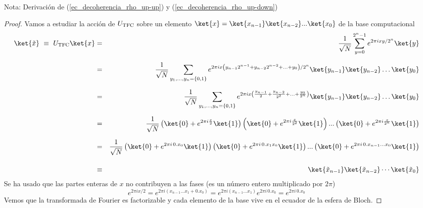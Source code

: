 \documentclass[a4paper,11pt]{book} %
\numberwithin{equation}{chapter}
\begin{document}
\begin{mybox_blue}{Nota: Derivación de (\ref{ec_decoherencia_rho_up-up}) y  (\ref{ec_decoherencia_rho_up-down})}
	\begin{proof}
	Vamos a estudiar la acción de $U_{\rm TFC}$ sobre un elemento $\ket{x} = \ket{x_{n-1}}\ket{x_{n-2}}... \ket{x_0}$ de la base computacional 
	\begin{eqnarray*}
 \ket{\tilde x}  ~\equiv ~  U_{\rm TFC}\ket{x}  &=&  \frac{1}{\sqrt{N}} \sum_{y=0}^{2^n-1} e^{2\pi i  xy/2^n}\ket{y}      \\ \rule{0mm}{7mm}
&=&  \frac{1}{\sqrt{N}} \sum_{y_1,...,y_n=\{0,1\}} e^{ 2\pi i x \left( y_{n-1}2^{n-1} + y_{n-2}2^{n-2}  + ... + y_0\right)/2^n } \ket{y_{n-1}}\ket{y_{n-2}}\ldots \ket{ y_0}   \\ \rule{0mm}{7mm}
&=&  \frac{1}{\sqrt{N}} \sum_{y_1,...,y_n=\{0,1\}} e^{2\pi i x \left(\frac{y_{n-1}}{2} + \frac{y_{n-2}}{2^2}  + ... + \frac{y_0}{2^n}\right) } \ket{y_{n-1}}\ket{y_{n-2}}\ldots \ket{ y_0}  \\ \rule{0mm}{7mm}
&=&  \frac{1}{\sqrt{N}} \left( \ket{0} + e^{2\pi i \frac{x}{2}}\ket{1}\right)\left( \ket{0} + e^{2\pi i \frac{x}{2^2}}\ket{1}\right)...\left( \ket{0} + e^{2\pi i \frac{x}{2^n}}\ket{1}\right) \\ \rule{0mm}{7mm}
&=& \frac{1}{\sqrt{N}} \left( \ket{0} + e^{2\pi i \, 0.x_0}\ket{1}\right)\left( \ket{0} + e^{2\pi i \, 0.x_1x_0}\ket{1}\right)...\left( \ket{0} + e^{2\pi i \, 0.x_{n-1}...x_0}\ket{1}\right)    \\ \rule{0mm}{7mm}
&\equiv & ~~ \ket{\tilde x_{n-1}}\ket{\tilde x_{n-2}}\cdots \ket{\tilde x_{0}}   
\end{eqnarray*}
Se ha usado que las partes enteras de $x$ no contribuyen a las fases (es un número entero multiplicado por $2\pi$)
	\begin{equation} \label{ec_QFT_demostracion_equiv_exp}
	e^{2\pi i x/2} = e^{2\pi i (x_{n-1}...x_1 + 0. x_0)}= e^{2\pi i (x_{n-1}...x_1)}e^{2\pi i \, 0. x_0} = e^{2\pi i\, 0.x_0}
	\end{equation}
Vemos que la transformada de Fourier es factorizable y cada elemento de la base vive en el ecuador de la esfera de Bloch.
	\end{proof}


\end{mybox_blue}
\end{document}
